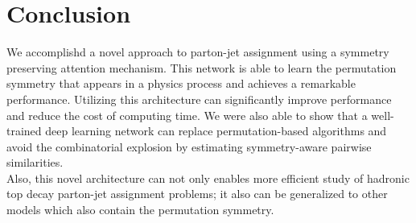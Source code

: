 \chapter{Conclusion}

We accomplishd a novel approach to parton-jet assignment using a symmetry preserving attention mechanism. This network is able to learn the permutation symmetry that appears in a physics process and achieves a remarkable performance. Utilizing this architecture can significantly improve performance and reduce the cost of computing time. We were also able to show that a well-trained deep learning network can replace permutation-based algorithms and avoid the combinatorial explosion by estimating symmetry-aware pairwise similarities.
\\
Also, this novel architecture can not only enables more efficient study of hadronic top decay parton-jet assignment problems; it also can be generalized to other models which also contain the permutation symmetry. 